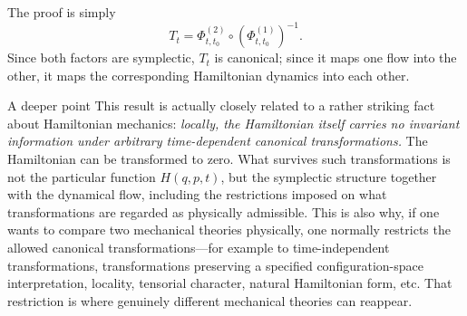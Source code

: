 The proof is simply
\[
\boxed{
T_t=
\Phi^{(2)}_{t,t_0}
\circ
(\Phi^{(1)}_{t,t_0})^{-1}.
}
\]
Since both factors are symplectic, \(T_t\) is canonical; since it maps one flow
into the other, it maps the corresponding Hamiltonian dynamics into each other.

A deeper point
This result is actually closely related to a rather striking fact about
Hamiltonian mechanics:
\emph{locally, the Hamiltonian itself carries no invariant information under
arbitrary time-dependent canonical transformations.}
The Hamiltonian can be transformed to zero.
What survives such transformations is not the particular function \(H(q,p,t)\),
but the symplectic structure together with the dynamical flow, including the
restrictions imposed on what transformations are regarded as physically
admissible.
This is also why, if one wants to compare two mechanical theories physically,
one normally restricts the allowed canonical transformations—for example to
time-independent transformations, transformations preserving a specified
configuration-space interpretation, locality, tensorial character, natural
Hamiltonian form, etc.
That restriction is where genuinely different mechanical theories can reappear.
